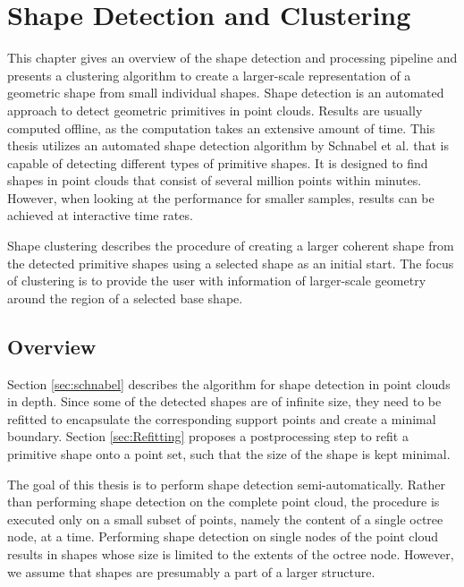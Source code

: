 \chapter{Shape Detection and Clustering}
\label{chap:shapeDetection}

This chapter gives an overview of the shape detection and processing pipeline and presents a clustering algorithm to create a larger-scale representation of a geometric shape from small individual shapes. 
Shape detection is an automated approach to detect geometric primitives in point clouds. Results are usually computed offline, as the computation takes an extensive amount of time. This thesis utilizes an automated shape detection algorithm by Schnabel et al. \cite{schnabel-2007-efficient} that is capable of detecting different types of primitive shapes. It is designed to find shapes in point clouds that consist of several million points within minutes. However, when looking at the performance for smaller samples, results can be achieved at interactive time rates. 

\par

Shape clustering describes the procedure of creating a larger coherent shape from the detected primitive shapes using a selected shape as an initial start. The focus of clustering is to provide the user with information of larger-scale geometry around the region of a selected base shape. 


\section{Overview}

Section \ref{sec:schnabel} describes the algorithm for shape detection in point clouds in depth. Since some of the detected shapes are of infinite size, they need to be refitted to encapsulate the corresponding support points and create a minimal boundary. Section \ref{sec:Refitting} proposes a postprocessing step to refit a primitive shape onto a point set, such that the size of the shape is kept minimal. 

\par

The goal of this thesis is to perform shape detection semi-automatically. Rather than performing shape detection on the complete point cloud, the procedure is executed only on a small subset of points, namely the content of a single octree node, at a time. Performing shape detection on single nodes of the point cloud results in shapes whose size is limited to the extents of the octree node. However, we assume that shapes are presumably a part of a larger structure. 

